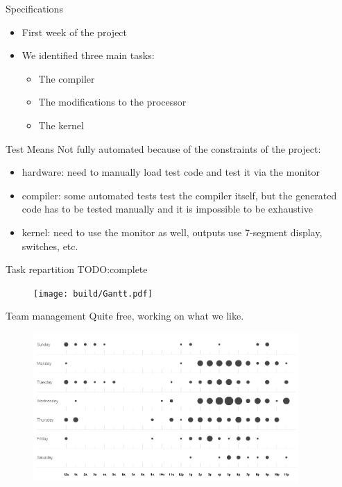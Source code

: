 \documentclass{beamer}
\begin{document}
      \begin{frame}{Specifications}
        \begin{itemize}
          \item First week of the project
          \item We identified three main tasks:
            \begin{itemize}
              \item The compiler
              \item The modifications to the processor
              \item The kernel
            \end{itemize}
          \end{itemize}
      \end{frame}

      \begin{frame}{Test Means}
        Not fully automated because of the constraints of the project:
        \begin{itemize}
          \item hardware: need to manually load test code and test it via the
            monitor
          \item compiler: some automated tests test the compiler itself, but the
            generated code has to be tested manually and it is impossible to be
            exhaustive
          \item kernel: need to use the monitor as well, outputs use 7-segment
            display, switches, etc.
        \end{itemize}
      \end{frame}

      \begin{frame}{Task repartition}
          TODO:complete
      \end{frame}

      \begin{frame}[plain]
        \begin{figure}
          \texttt{[image: build/Gantt.pdf]}
        \end{figure}
      \end{frame}

      \begin{frame}{Team management}
        Quite free, working on what we like.

        \begin{figure}
          \centering
          \includegraphics[width=0.9\textwidth]{fig/punchcard.png}
        \end{figure}
      \end{frame}
\end{document}
